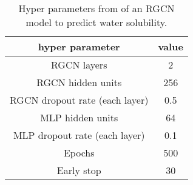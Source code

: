 \begin{table}[h]
    \caption{ Hyper parameters from \protect{} of an RGCN model to predict water solubility.}
    \label{tab:hyperparameters}
    \begin{center}
        \begin{tabular}{cc}
            \toprule
            \textbf{hyper parameter} & \textbf{value} \\
            \midrule
            RGCN layers & 2 \\
            RGCN hidden units & 256 \\
            RGCN dropout rate (each layer) & 0.5 \\
            MLP hidden units & 64 \\
            MLP dropout rate (each layer) & 0.1 \\ 
            Epochs & 500 \\
            Early stop & 30 \\
            \bottomrule
        \end{tabular}
    \end{center}
\end{table}


